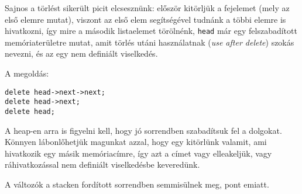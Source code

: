 \documentclass[a4paper,11.5pt,table]{article}
\begin{document}
	\begin{center}
	\end{center}
	Sajnos a törlést sikerült picit elcsesznünk: először kitörljük a fejelemet (mely az első elemre mutat), viszont az első elem segítségével tudnánk a többi elemre is hivatkozni, így mire a második listaelemet törölnénk, \texttt{head} már egy felszabadított memóriaterületre mutat, amit törlés utáni használatnak (\textit{use after delete}) szokás nevezni, és az egy nem definiált viselkedés.
	
	A megoldás:
	\begin{lstlisting}
delete head->next->next;
delete head->next;
delete head;
	\end{lstlisting}
	\begin{note}
		A heap-en arra is figyelni kell, hogy jó sorrendben szabadítsuk fel a dolgokat. Könnyen lábonlőhetjük magunkat azzal, hogy egy kitörlünk valamit, ami hivatkozik egy másik memóriacímre, így azt a címet vagy elleakeljük, vagy ráhivatkozással nem definiált viselkedésbe keveredünk.
	\end{note}
	A változók a stacken fordított sorrendben semmisülnek meg, pont emiatt.
	\medskip
	
\end{document}
